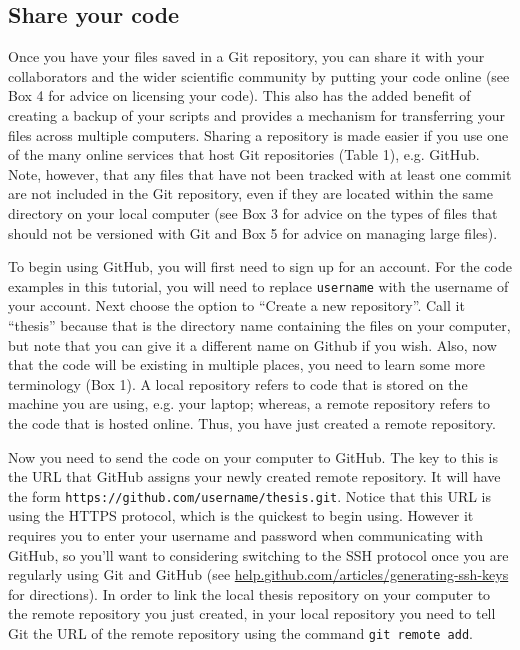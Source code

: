\subsection{Share your code}

Once you have your files saved in a Git repository, you can share it with your collaborators and the wider scientific community by putting your code online (see Box 4 for advice on licensing your code).
This also has the added benefit of creating a backup of your scripts and provides a mechanism for transferring your files across multiple computers.
Sharing a repository is made easier if you use one of the many online services that host Git repositories (Table 1), e.g. GitHub.
Note, however, that any files that have not been tracked with at least one commit are not included in the Git repository, even if they are located within the same directory on your local computer (see Box 3 for advice on the types of files that should not be versioned with Git and Box 5 for advice on managing large files).

To begin using GitHub, you will first need to sign up for an account.
For the code examples in this tutorial, you will need to replace \verb|username| with the username of your account.
Next choose the option to ``Create a new repository''.
Call it ``thesis'' because that is the directory name containing the files on your computer, but note that you can give it a different name on Github if you wish.
Also, now that the code will be existing in multiple places, you need to learn some more terminology (Box 1).
A local repository refers to code that is stored on the machine you are using, e.g. your laptop; whereas, a remote repository refers to the code that is hosted online.
Thus, you have just created a remote repository.

Now you need to send the code on your computer to GitHub.
The key to this is the URL that GitHub assigns your newly created remote repository.
It will have the form \verb|https://github.com/username/thesis.git|.
Notice that this URL is using the HTTPS protocol, which is the quickest to begin using.
However it requires you to enter your username and password when communicating with GitHub, so you'll want to considering switching to the SSH protocol once you are regularly using Git and GitHub (see \href{https://help.github.com/articles/generating-ssh-keys/}{help.github.com/articles/generating-ssh-keys} for directions).
In order to link the local thesis repository on your computer to the remote repository you just created, in your local repository you need to tell Git the URL of the remote repository using the command \verb|git remote add|.

